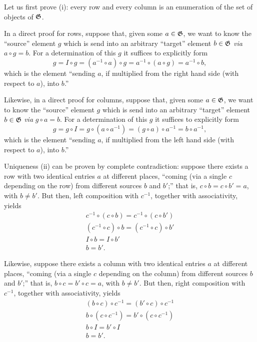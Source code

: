 {\color{OliveGreen}
\bproof
Let us first prove (i): every row and every column is an enumeration of the set of objects of ${\frak G}$.

In a direct proof for rows, suppose that, given some $a\in {\frak G}$,  we want to know the ``source'' element $g$
which is send  into an arbitrary ``target'' element $b\in {\frak G}$ {\it via} $a \circ g = b$.
For a determination of this $g$ it suffices to explicitly form
\begin{equation}
g = I \circ  g =  (a^{-1} \circ a) \circ g = a^{-1} \circ (a \circ g) =  a^{-1}  \circ b,
\end{equation}
which is the element ``sending $a$, if multiplied from the right hand side (with respect to $a$), into $b$.''


Likewise, in a direct proof for columns, suppose that, given some $a\in {\frak G}$,  we want to know the ``source'' element $g$
which is send  into an arbitrary ``target'' element $b\in {\frak G}$ {\it via} $g \circ a = b$.
For a determination of this $g$ it suffices to explicitly form
\begin{equation}
g = g \circ I  =  g \circ ( a\circ a^{-1}  ) = ( g \circ a )\circ a^{-1}   = b  \circ  a^{-1},
\end{equation}
which is the element ``sending $a$, if multiplied from the left hand side (with respect to $a$), into $b$.''



Uniqueness (ii) can be proven by complete contradiction:
suppose there exists a row with two identical entries $a$ at different places, ``coming (via a single $c$ depending on the row)
from different sources $b$ and $b'$;''
that is, $c \circ b =   c \circ b' = a$, with $b \neq b'$.
But then, left composition with $c^{-1}$, together with associativity, yields
\begin{equation}
\begin{split}
c^{-1} \circ (c \circ b) = c^{-1} \circ  (c \circ b') \\
(c^{-1} \circ c) \circ b = (c^{-1} \circ  c) \circ b' \\
I \circ b = I \circ b' \\
b = b' .
\end{split}
\label{2017-m-ch-gt-pouer}
\end{equation}

Likewise,
suppose there exists a column with two identical entries $a$ at different places, ``coming (via a single $c$ depending on the column)
from different sources $b$ and $b'$;''
that is, $b \circ  c =  b' \circ  c = a$, with $b \neq b'$.
But then, right composition with $c^{-1}$, together with associativity, yields
\begin{equation}
\begin{split}
(b \circ  c) \circ c^{-1}=  (b' \circ  c) \circ c^{-1}\\
b \circ  (c \circ c^{-1})=  b' \circ  (c \circ c^{-1})\\
b \circ  I=  b' \circ  I\\
b  =  b'
.
\end{split}
\label{2017-m-ch-gt-pouec}
\end{equation}
\eproof
}

